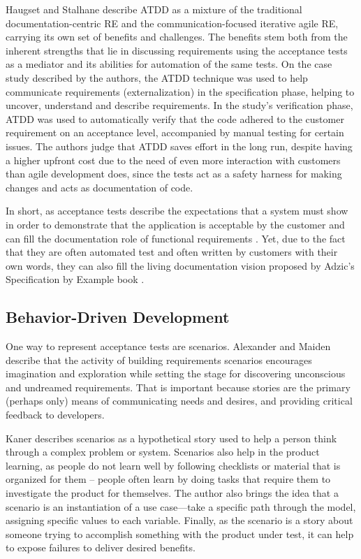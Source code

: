 Haugset and Stalhane \cite{Haugset_2012} describe ATDD as a mixture of the traditional documentation-centric RE and the communication-focused iterative agile RE, carrying its own set of benefits and challenges. The benefits stem both from the inherent strengths that lie in discussing requirements using the acceptance tests as a mediator and its abilities for automation of the same tests. On the case study described by the authors, the ATDD technique was used to help communicate requirements (externalization) in the specification phase, helping to uncover, understand and describe requirements. In the study's verification phase, ATDD was used to automatically verify that the code adhered to the customer requirement on an acceptance level, accompanied by manual testing for certain issues. The authors judge that ATDD saves effort in the long run, despite having a higher upfront cost due to the need of even more interaction with customers than agile development does, since the tests act as a safety harness for making changes and acts as documentation of code.

In short, as acceptance tests describe the expectations that a system must show in order to demonstrate that the application is acceptable by the customer \cite{Cohn_2004} and can fill the documentation role of functional requirements \cite{Babok_2009}\cite{Babok_2015}. Yet, due to the fact that they are often automated test and often written by customers with their own words, they can also fill the living documentation vision proposed by Adzic's Specification by Example book \cite{Adzic_2011}.

\subsection{\label{chap:chap2_bdd}Behavior-Driven Development}

One way to represent acceptance tests are scenarios. Alexander and Maiden \cite{Alexander_and_Maiden_2004} describe that the activity of building requirements scenarios encourages imagination and exploration while setting the stage for discovering unconscious and undreamed requirements. That is important because stories are the primary (perhaps only) means of communicating needs and desires, and providing critical feedback to developers.

Kaner \cite{Kaner_2003} describes scenarios as a hypothetical story used to help a person think through a complex problem or system. Scenarios also help in the product learning, as people do not learn well by following checklists or material that is organized for them -- people often learn by doing tasks that require them to investigate the product for themselves. The author also brings the idea that a scenario is an instantiation of a use case—take a specific path through the model, assigning specific values to each variable. Finally, as the scenario is a story about someone trying to accomplish something with the product under test, it can help to expose failures to deliver desired benefits.

